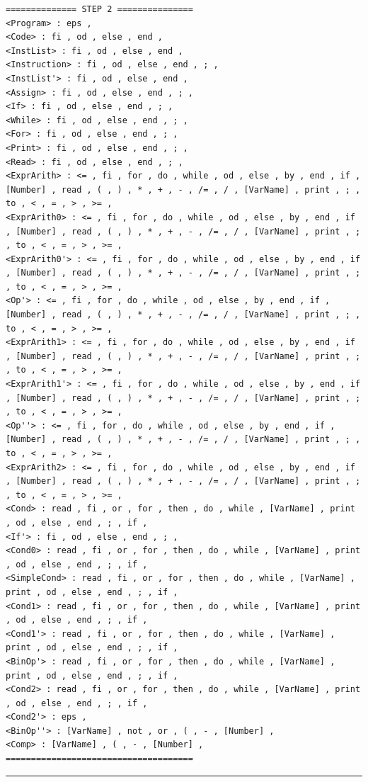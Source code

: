 \documentclass[pdftex,10pt,a4paper]{article}
\begin{document}
\begin{lstlisting}[breaklines]
============== STEP 2 ===============
<Program> : eps , 
<Code> : fi , od , else , end , 
<InstList> : fi , od , else , end , 
<Instruction> : fi , od , else , end , ; , 
<InstList'> : fi , od , else , end , 
<Assign> : fi , od , else , end , ; , 
<If> : fi , od , else , end , ; , 
<While> : fi , od , else , end , ; , 
<For> : fi , od , else , end , ; , 
<Print> : fi , od , else , end , ; , 
<Read> : fi , od , else , end , ; , 
<ExprArith> : <= , fi , for , do , while , od , else , by , end , if , [Number] , read , ( , ) , * , + , - , /= , / , [VarName] , print , ; , to , < , = , > , >= , 
<ExprArith0> : <= , fi , for , do , while , od , else , by , end , if , [Number] , read , ( , ) , * , + , - , /= , / , [VarName] , print , ; , to , < , = , > , >= , 
<ExprArith0'> : <= , fi , for , do , while , od , else , by , end , if , [Number] , read , ( , ) , * , + , - , /= , / , [VarName] , print , ; , to , < , = , > , >= , 
<Op'> : <= , fi , for , do , while , od , else , by , end , if , [Number] , read , ( , ) , * , + , - , /= , / , [VarName] , print , ; , to , < , = , > , >= , 
<ExprArith1> : <= , fi , for , do , while , od , else , by , end , if , [Number] , read , ( , ) , * , + , - , /= , / , [VarName] , print , ; , to , < , = , > , >= , 
<ExprArith1'> : <= , fi , for , do , while , od , else , by , end , if , [Number] , read , ( , ) , * , + , - , /= , / , [VarName] , print , ; , to , < , = , > , >= , 
<Op''> : <= , fi , for , do , while , od , else , by , end , if , [Number] , read , ( , ) , * , + , - , /= , / , [VarName] , print , ; , to , < , = , > , >= , 
<ExprArith2> : <= , fi , for , do , while , od , else , by , end , if , [Number] , read , ( , ) , * , + , - , /= , / , [VarName] , print , ; , to , < , = , > , >= , 
<Cond> : read , fi , or , for , then , do , while , [VarName] , print , od , else , end , ; , if , 
<If'> : fi , od , else , end , ; , 
<Cond0> : read , fi , or , for , then , do , while , [VarName] , print , od , else , end , ; , if , 
<SimpleCond> : read , fi , or , for , then , do , while , [VarName] , print , od , else , end , ; , if , 
<Cond1> : read , fi , or , for , then , do , while , [VarName] , print , od , else , end , ; , if , 
<Cond1'> : read , fi , or , for , then , do , while , [VarName] , print , od , else , end , ; , if , 
<BinOp'> : read , fi , or , for , then , do , while , [VarName] , print , od , else , end , ; , if , 
<Cond2> : read , fi , or , for , then , do , while , [VarName] , print , od , else , end , ; , if , 
<Cond2'> : eps , 
<BinOp''> : [VarName] , not , or , ( , - , [Number] , 
<Comp> : [VarName] , ( , - , [Number] , 
=====================================
\end{lstlisting}

\noindent\rule[0.5ex]{\linewidth}{1pt}
\end{document}
